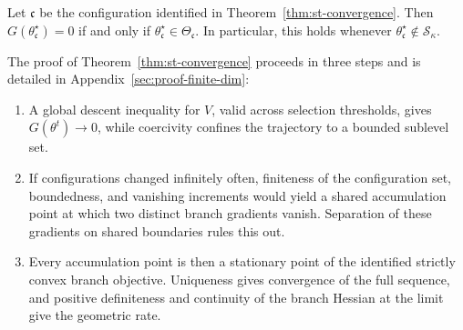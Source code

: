 \begin{remark}
Let $\mathfrak c$ be the configuration identified in
Theorem~\ref{thm:st-convergence}.
Then $G(\theta_{\mathfrak c}^\star)=0$ if and only if
$\theta_{\mathfrak c}^\star\in\Theta_{\mathfrak c}$.
In particular, this holds whenever
$\theta_{\mathfrak c}^\star\notin\mathcal S_\kappa$.
\end{remark}

The proof of Theorem~\ref{thm:st-convergence} proceeds in three steps
and is detailed in Appendix~\ref{sec:proof-finite-dim}:
\begin{enumerate}
    \item A global descent inequality for $V$, valid across
    selection thresholds, gives $G(\theta^t)\to0$, while
    coercivity confines the trajectory to a bounded sublevel set.

    \item If configurations changed infinitely often, finiteness
    of the configuration set, boundedness, and vanishing increments
    would yield a shared accumulation point at which two distinct
    branch gradients vanish. Separation of these gradients on
    shared boundaries rules this out.

    \item Every accumulation point is then a stationary point of
    the identified strictly convex branch objective. Uniqueness
    gives convergence of the full sequence, and positive
    definiteness and continuity of the branch Hessian at the
    limit give the geometric rate.
\end{enumerate}

